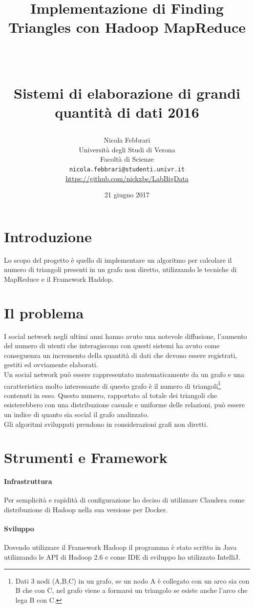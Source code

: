 \documentclass[paper=a4, fontsize=11pt]{scrartcl}	%
\title{ \vspace{-1in} 	\usefont{OT1}{bch}{b}{n}
		\huge \strut Implementazione di Finding Triangles con Hadoop MapReduce\strut \\
		\Large \bfseries \strut Sistemi di elaborazione di grandi quantità di dati 2016 \strut
}
\author{ 									\usefont{OT1}{bch}{m}{n}
        Nicola Febbrari\\		\usefont{OT1}{bch}{m}{n}
        Università degli Studi di Verona\\	\usefont{OT1}{bch}{m}{n}
        Facoltà di Scienze\\
        \texttt{nicola.febbrari@studenti.univr.it}\\
        \href{https://github.com/nickxbs/LabBigData}{https://github.com/nickxbs/LabBigData}
}
\date{21 giugno 2017}
\numberwithin{equation}{section}															%
\numberwithin{figure}{section}																%
\numberwithin{table}{section}																%
\begin{document}
\maketitle
\section{Introduzione}
Lo scopo del progetto è quello di implementare un algoritmo per calcolare il numero di triangoli presenti in un grafo non diretto, utilizzando le tecniche di MapReduce e il Framework Haddop.


\section{Il problema}
I social network negli ultimi anni hanno avuto una notevole diffusione, l'aumento del numero di utenti che interagiscono con questi sistemi ha avuto come conseguenza un  incremento della quantità di dati che devono essere registrati, gestiti ed ovviamente elaborati.\\
Un social network può essere rappresentato matematicamente da un grafo e una caratteristica molto interessante di questo grafo è il numero di triangoli\footnote{Dati 3 nodi (A,B,C) in un grafo, se un nodo A è collegato con un arco sia con B che con C, nel grafo viene a formarsi un triangolo se esiste anche l'arco che lega B con C.} 
contenuti in esso. Questo numero, rapportato al totale dei triangoli che esisterebbero con una distribuzione casuale e uniforme delle relazioni, può essere un indice di quanto sia social il grafo analizzato.\\
Gli algoritmi sviluppati prendono in considerazioni grafi non diretti.\\
\section{Strumenti e Framework}
\paragraph{Infrastruttura}
Per semplicità e rapidità di configurazione ho deciso di utilizzare Claudera come distribuzione di Hadoop nella sua versione per Docker.
\paragraph{Sviluppo}
Dovendo utilizzare il Framework Hadoop il programma è stato scritto in Java utilizzando le API di Hadoop 2.6 e come IDE di sviluppo ho utilizzato IntelliJ.  
\end{document}
